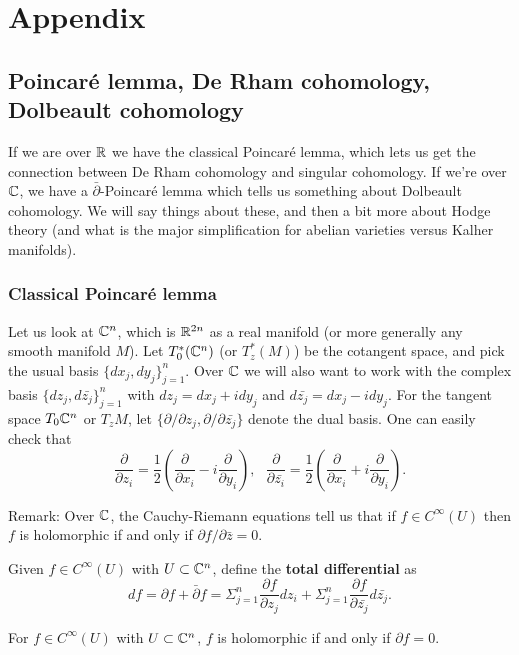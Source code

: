 



\section{Appendix}\label{Chapters/appendix}

\subsection{Poincar\'{e} lemma, De Rham cohomology, Dolbeault cohomology}

If we are over ${\mathbb R}$ we have the classical Poincar\'{e} lemma, which lets us get the connection between De Rham cohomology and singular cohomology. If we're over ${\mathbb C}$, we have a $\bar{\partial}$-Poincar\'{e} lemma which tells us something about Dolbeault cohomology. We will say things about these, and then a bit more about Hodge theory (and what is the major simplification for abelian varieties versus Kalher manifolds).

\subsubsection{Classical Poincar\'{e} lemma} 
Let us look at ${\mathbb C}^n$, which is ${\mathbb R}^{2n}$ as a real manifold (or more generally any smooth manifold $M$). Let $T_0^*({\mathbb C}^n)$ (or $T_z^*(M)$) be the cotangent space, and pick the usual basis $\{dx_j,dy_j\}_{j=1}^n$. Over ${\mathbb C}$ we will also want to work with the complex basis $\{dz_j,d\bar{z_j}\}_{j=1}^n$ with $dz_j=dx_j+idy_j$ and $d\bar{z_j}=dx_j-idy_j$. For the tangent space $T_0 {\mathbb C}^n$ or $T_z M$, let $\{\partial/\partial z_j,\partial/\partial \bar{z_j}\}$ denote the dual basis. One can easily check that 
$$\frac{\partial}{\partial z_i}=\frac{1}{2}\left(\frac{\partial}{\partial x_i}-i\frac{\partial}{\partial y_i}\right),\ \ \ \frac{\partial}{\partial \bar{z_i}}=\frac{1}{2}\left(\frac{\partial}{\partial x_i}+i\frac{\partial}{\partial y_i}\right).$$

Remark: Over ${\mathbb C}$, the Cauchy-Riemann equations tell us that if $f\in C^\infty(U)$ then $f$ is holomorphic if and only if $\partial f/\partial \bar{z}=0$. 

Given $f\in C^\infty(U)$ with $U\subset {\mathbb C}^n$, define the \textbf{total differential} as 
$$df=\partial f+\bar{\partial}f=\Sigma_{j=1}^n \frac{\partial f}{\partial z_j}dz_i+\Sigma_{j=1}^n \frac{\partial f}{\partial \bar{z_j}}d\bar{z_j}.$$

\begin{theorem}
For $f\in C^\infty(U)$ with $U\subset {\mathbb C}^n$, $f$ is holomorphic if and only if $\partial f=0$. 
\end{theorem}

